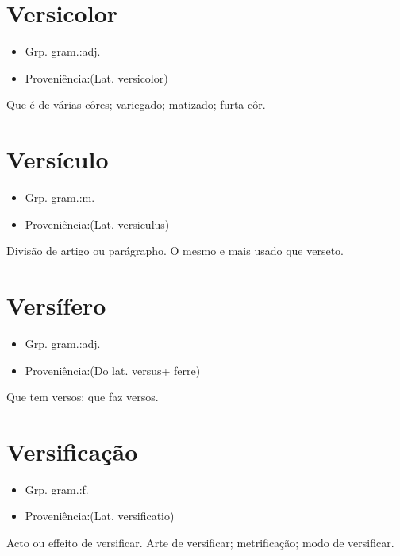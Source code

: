\documentclass{article}
\begin{document}
\section{Versicolor}
\begin{itemize}
\item {Grp. gram.:adj.}
\end{itemize}
\begin{itemize}
\item {Proveniência:(Lat. \textunderscore versicolor\textunderscore )}
\end{itemize}
Que é de várias côres; variegado; matizado; furta-côr.
\section{Versículo}
\begin{itemize}
\item {Grp. gram.:m.}
\end{itemize}
\begin{itemize}
\item {Proveniência:(Lat. \textunderscore versiculus\textunderscore )}
\end{itemize}
Divisão de artigo ou parágrapho.
O mesmo e mais usado que \textunderscore verseto\textunderscore .
\section{Versífero}
\begin{itemize}
\item {Grp. gram.:adj.}
\end{itemize}
\begin{itemize}
\item {Proveniência:(Do lat. \textunderscore versus\textunderscore  + \textunderscore ferre\textunderscore )}
\end{itemize}
Que tem versos; que faz versos.
\section{Versificação}
\begin{itemize}
\item {Grp. gram.:f.}
\end{itemize}
\begin{itemize}
\item {Proveniência:(Lat. \textunderscore versificatio\textunderscore )}
\end{itemize}
Acto ou effeito de versificar.
Arte de versificar; metrificação; modo de versificar.
\end{document}
